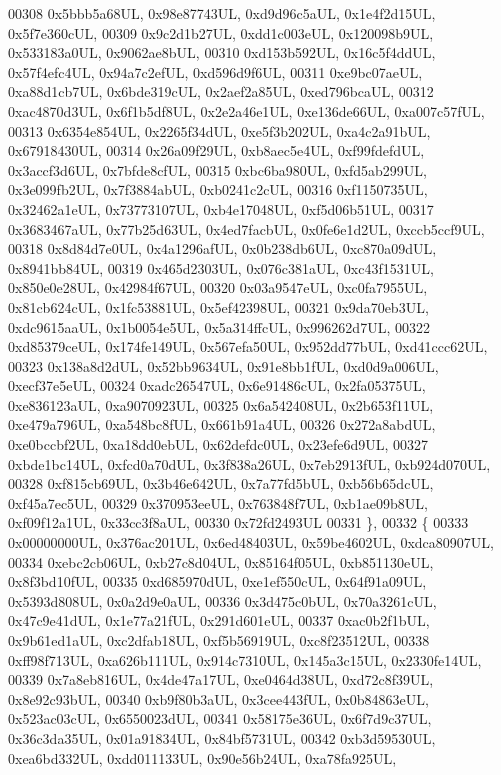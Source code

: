 \begin{DoxyCode}
00308     0x5bbb5a68UL, 0x98e87743UL, 0xd9d96c5aUL, 0x1e4f2d15UL, 0x5f7e360cUL,
00309     0x9c2d1b27UL, 0xdd1c003eUL, 0x120098b9UL, 0x533183a0UL, 0x9062ae8bUL,
00310     0xd153b592UL, 0x16c5f4ddUL, 0x57f4efc4UL, 0x94a7c2efUL, 0xd596d9f6UL,
00311     0xe9bc07aeUL, 0xa88d1cb7UL, 0x6bde319cUL, 0x2aef2a85UL, 0xed796bcaUL,
00312     0xac4870d3UL, 0x6f1b5df8UL, 0x2e2a46e1UL, 0xe136de66UL, 0xa007c57fUL,
00313     0x6354e854UL, 0x2265f34dUL, 0xe5f3b202UL, 0xa4c2a91bUL, 0x67918430UL,
00314     0x26a09f29UL, 0xb8aec5e4UL, 0xf99fdefdUL, 0x3accf3d6UL, 0x7bfde8cfUL,
00315     0xbc6ba980UL, 0xfd5ab299UL, 0x3e099fb2UL, 0x7f3884abUL, 0xb0241c2cUL,
00316     0xf1150735UL, 0x32462a1eUL, 0x73773107UL, 0xb4e17048UL, 0xf5d06b51UL,
00317     0x3683467aUL, 0x77b25d63UL, 0x4ed7facbUL, 0x0fe6e1d2UL, 0xccb5ccf9UL,
00318     0x8d84d7e0UL, 0x4a1296afUL, 0x0b238db6UL, 0xc870a09dUL, 0x8941bb84UL,
00319     0x465d2303UL, 0x076c381aUL, 0xc43f1531UL, 0x850e0e28UL, 0x42984f67UL,
00320     0x03a9547eUL, 0xc0fa7955UL, 0x81cb624cUL, 0x1fc53881UL, 0x5ef42398UL,
00321     0x9da70eb3UL, 0xdc9615aaUL, 0x1b0054e5UL, 0x5a314ffcUL, 0x996262d7UL,
00322     0xd85379ceUL, 0x174fe149UL, 0x567efa50UL, 0x952dd77bUL, 0xd41ccc62UL,
00323     0x138a8d2dUL, 0x52bb9634UL, 0x91e8bb1fUL, 0xd0d9a006UL, 0xecf37e5eUL,
00324     0xadc26547UL, 0x6e91486cUL, 0x2fa05375UL, 0xe836123aUL, 0xa9070923UL,
00325     0x6a542408UL, 0x2b653f11UL, 0xe479a796UL, 0xa548bc8fUL, 0x661b91a4UL,
00326     0x272a8abdUL, 0xe0bccbf2UL, 0xa18dd0ebUL, 0x62defdc0UL, 0x23efe6d9UL,
00327     0xbde1bc14UL, 0xfcd0a70dUL, 0x3f838a26UL, 0x7eb2913fUL, 0xb924d070UL,
00328     0xf815cb69UL, 0x3b46e642UL, 0x7a77fd5bUL, 0xb56b65dcUL, 0xf45a7ec5UL,
00329     0x370953eeUL, 0x763848f7UL, 0xb1ae09b8UL, 0xf09f12a1UL, 0x33cc3f8aUL,
00330     0x72fd2493UL
00331   \},
00332   \{
00333     0x00000000UL, 0x376ac201UL, 0x6ed48403UL, 0x59be4602UL, 0xdca80907UL,
00334     0xebc2cb06UL, 0xb27c8d04UL, 0x85164f05UL, 0xb851130eUL, 0x8f3bd10fUL,
00335     0xd685970dUL, 0xe1ef550cUL, 0x64f91a09UL, 0x5393d808UL, 0x0a2d9e0aUL,
00336     0x3d475c0bUL, 0x70a3261cUL, 0x47c9e41dUL, 0x1e77a21fUL, 0x291d601eUL,
00337     0xac0b2f1bUL, 0x9b61ed1aUL, 0xc2dfab18UL, 0xf5b56919UL, 0xc8f23512UL,
00338     0xff98f713UL, 0xa626b111UL, 0x914c7310UL, 0x145a3c15UL, 0x2330fe14UL,
00339     0x7a8eb816UL, 0x4de47a17UL, 0xe0464d38UL, 0xd72c8f39UL, 0x8e92c93bUL,
00340     0xb9f80b3aUL, 0x3cee443fUL, 0x0b84863eUL, 0x523ac03cUL, 0x6550023dUL,
00341     0x58175e36UL, 0x6f7d9c37UL, 0x36c3da35UL, 0x01a91834UL, 0x84bf5731UL,
00342     0xb3d59530UL, 0xea6bd332UL, 0xdd011133UL, 0x90e56b24UL, 0xa78fa925UL,

\end{DoxyCode}
